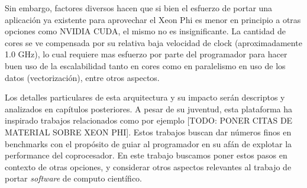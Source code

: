 Sin embargo, factores diversos hacen que si bien el esfuerzo de portar una aplicación ya existente para aprovechar el Xeon Phi es menor en principio
a otras opciones como NVIDIA CUDA, el mismo no es insignificante. La cantidad de cores se ve compensada por su relativa baja velocidad de clock 
(aproximadamente 1.0 GHz), lo cual requiere mas esfuerzo por parte del programador para hacer buen uso de la escalabilidad tanto en cores como en 
paralelismo en uso de los datos (vectorización), entre otros aspectos. 

Los detalles particulares de esta arquitectura y su impacto serán descriptos y analizados en capítulos posteriores. 
A pesar de su juventud, esta plataforma ha inspirado trabajos relacionados como por ejemplo [TODO: PONER CITAS DE MATERIAL SOBRE XEON PHI]. Estos trabajos
buscan dar números finos en benchmarks con el propósito de guiar al programador en su afán de explotar la performance del coprocesador. En este trabajo buscamos
poner estos pasos en contexto de otras opciones, y considerar otros aspectos relevantes al trabajo de portar \textit{software} de computo científico.
